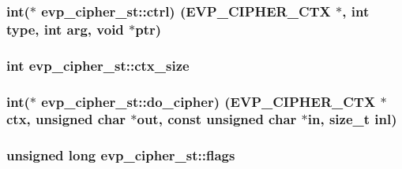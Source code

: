 \subsubsection[{\texorpdfstring{ctrl}{ctrl}}]{\setlength{\rightskip}{0pt plus 5cm}int($\ast$ evp\+\_\+cipher\+\_\+st\+::ctrl) ({\bf E\+V\+P\+\_\+\+C\+I\+P\+H\+E\+R\+\_\+\+C\+TX} $\ast$, int {\bf type}, int arg, void $\ast$ptr)}\hypertarget{structevp__cipher__st_a7f3ad30b0b90b5740b831b9e7aa43cbe}{}\label{structevp__cipher__st_a7f3ad30b0b90b5740b831b9e7aa43cbe}
\subsubsection[{\texorpdfstring{ctx\+\_\+size}{ctx_size}}]{\setlength{\rightskip}{0pt plus 5cm}int evp\+\_\+cipher\+\_\+st\+::ctx\+\_\+size}\hypertarget{structevp__cipher__st_a856751b3bf79b35b6178f574dea3d1bc}{}\label{structevp__cipher__st_a856751b3bf79b35b6178f574dea3d1bc}
\subsubsection[{\texorpdfstring{do\+\_\+cipher}{do_cipher}}]{\setlength{\rightskip}{0pt plus 5cm}int($\ast$ evp\+\_\+cipher\+\_\+st\+::do\+\_\+cipher) ({\bf E\+V\+P\+\_\+\+C\+I\+P\+H\+E\+R\+\_\+\+C\+TX} $\ast$ctx, unsigned char $\ast$out, const unsigned char $\ast$in, size\+\_\+t inl)}\hypertarget{structevp__cipher__st_aa61fb3ac50f7917d1c00475f537d8328}{}\label{structevp__cipher__st_aa61fb3ac50f7917d1c00475f537d8328}
\subsubsection[{\texorpdfstring{flags}{flags}}]{\setlength{\rightskip}{0pt plus 5cm}unsigned long evp\+\_\+cipher\+\_\+st\+::flags}\hypertarget{structevp__cipher__st_a84a16719073d93e98517a6b38c47ba3f}{}\label{structevp__cipher__st_a84a16719073d93e98517a6b38c47ba3f}
